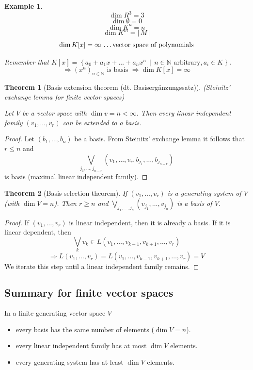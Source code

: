 \documentclass[a4paper,landscape,twocolumn]{article}
\newcommand\setdef[2]{\left\{#1\,\middle|\,#2\right\}}
\newcommand\card[1]{\left|\,#1\,\right|}
\newtheorem{theorem}{Theorem}
\newtheorem{ex}{Example}
\begin{document}
\begin{ex}
  \[ \dim{R^3} = 3 \]
  \[ \dim{\emptyset} = 0 \]
  \[ \dim{K^n} = n \]
  \[ \dim{K^m} = \card{M} \]
  \[ \dim{K[x]} = \infty \text{ \dots vector space of polynomials} \]

  Remember that $K[x] = \setdef{a_0 + a_1 x + \dots + a_n x^n}{n \in \mathbb N \text{ arbitrary}, a_i \in K}$.
  \[ \Rightarrow (x^n)_{n \in \mathbb N} \text{ is basis } \Rightarrow \dim{K[x]} = \infty \]
\end{ex}

\begin{theorem}[Basis extension theorem (dt. \foreignlanguage{ngerman}{Basisergänzungssatz})]
  \label{basis-extension}
  (Steinitz' exchange lemma for finite vector spaces)

  Let $V$ be a vector space with $\dim{v} = n < \infty$.
  Then every linear independent family $(v_1, \dots, v_r)$ can be extended to a basis.
\end{theorem}

\begin{proof}
  Let $(b_1, \dots, b_n)$ be a basis.
  From Steinitz' exchange lemma it follows that $r \leq n$ and
  \[ \bigvee_{j_1, \dots, j_{n-r}} (v_1, \dots, v_r, b_{j_1}, \dots, b_{j_{n-r}}) \]
  is basis (maximal linear independent family).
\end{proof}

\begin{theorem}[Basis selection theorem]
  If $(v_1, \dots, v_r)$ is a generating system of $V$ (with $\dim{V} = n$).
  Then $r \geq n$ and $\bigvee_{j_1, \dots, j_n} (v_{j_1}, \dots, v_{j_n})$ is a basis of $V$.
\end{theorem}

\begin{proof}
  If $(v_1, \dots, v_r)$ is linear independent, then it is already a basis.
  If it is linear dependent, then
  \[ \bigvee_{k} v_k \in L(v_1, \dots, v_{k-1}, v_{k+1}, \dots, v_r) \]
  \[ \Rightarrow L(v_1, \dots, v_r) = L(v_1, \dots, v_{k-1}, v_{k+1}, \dots, v_r) = V \]
  We iterate this step until a linear independent family remains.
\end{proof}

\subsection{Summary for finite vector spaces}
In a finite generating vector space $V$
\begin{itemize}
  \item every basis has the same number of elements ($\dim{V} = n$).
  \item every linear independent family has at most $\dim{V}$ elements.
  \item every generating system has at least $\dim{V}$ elements.
\end{itemize}
\end{document}
